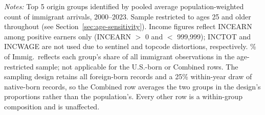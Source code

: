\begin{table}[!htbp]
\centering
\caption{Demographic Summary Statistics: Top 5 Origin Groups vs.\ U.S.-Born (Ages 25+)}
\label{tab:demographic_summary}
\begin{minipage}{\textwidth}
\footnotesize
\vspace{4pt}
\textit{Notes:} Top 5 origin groups identified by pooled average population-weighted count of immigrant arrivals, 2000--2023. Sample restricted to ages 25 and older throughout (see Section~\ref{sec:age-sensitivity}). Income figures reflect INCEARN among positive earners only (INCEARN $>$ 0 and $<$ 999{,}999); INCTOT and INCWAGE are not used due to sentinel and topcode distortions, respectively. \% of Immig.\ reflects each group's share of all immigrant observations in the age-restricted sample; not applicable for the U.S.-born or Combined rows. The sampling design retains all foreign-born records and a 25\% within-year draw of native-born records, so the Combined row averages the two groups in the design's proportions rather than the population's. Every other row is a within-group composition and is unaffected.
\end{minipage}
\end{table}


